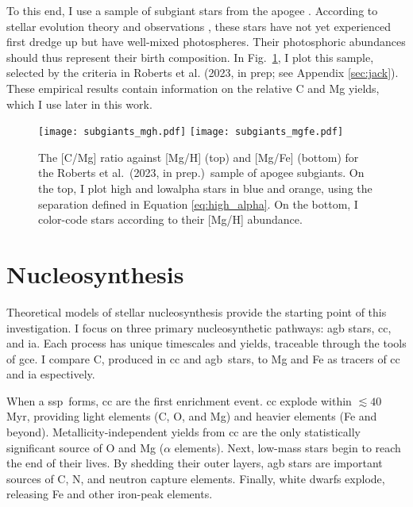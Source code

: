 \documentclass[12pt,oneside,letterpaper]{report}
\newcommand{\cc}{\gls{cc}}
\newcommand{\agb}{\gls{agb}}
\newcommand{\ia}{\gls{ia}}
\newcommand{\ssp}{\gls{ssp}}
\newcommand{\gce}{\gls{gce}}
\newcommand{\apogee}{\gls{apogee}}
\newcommand{\citetjack}{Roberts et al.~(2023, in prep.)}
\begin{document}
To this end, I use a sample of \gls{subgiant} stars from the \apogee{} \citep{apogee17}. According to stellar evolution theory and observations \citep{gilroy89, korn+07, lind+08, souto+18, souto19}, these stars have not yet experienced first dredge up but have well-mixed photospheres. Their photosphoric abundances should thus represent their birth composition.  In Fig.~\ref{fig:subgiants}, I plot this sample, selected by the criteria in Roberts et al. (2023, in prep; see Appendix \ref{sec:jack}). These empirical results contain information on the relative C and Mg yields, which I use later in this work.

\begin{figure}[htp]
    \centering
    \texttt{[image: subgiants\_mgh.pdf]}
    \quad\texttt{[image: subgiants\_mgfe.pdf]}
    \caption[APOGEE Subgiants]{The [C/Mg] ratio against [Mg/H] (top) and [Mg/Fe] (bottom) for the \citetjack~sample of \apogee{} \gls{subgiant}s. On the top, I plot high and \gls{lowalpha} stars in blue and orange, using the separation defined in Equation \ref{eq:high_alpha}. On the bottom, I color-code stars according to their [Mg/H] abundance.}
    \label{fig:subgiants}
\end{figure}








\chapter{Nucleosynthesis}

Theoretical models of stellar \gls{nucleosynthesis} provide the starting point of this investigation. I focus on three primary nucleosynthetic pathways: \agb{} stars, \cc{}, and \ia. Each process has unique timescales and \gls{yield}s, traceable through the tools of \gce. I compare C, produced in \cc{} and \agb\ stars, to Mg and Fe as tracers of \cc{} and \ia{} espectively.

When a \ssp~forms, \cc{} are the first enrichment event. \cc{}  explode within $\lesssim 40$ Myr, providing light elements (C, O, and Mg) and heavier elements (Fe and beyond). Metallicity-independent yields from \cc{} are the only statistically significant source of O and Mg ($\alpha$ elements). Next, low-mass stars begin to reach the end of their lives. By shedding their outer layers, \agb{} stars are important sources of C, N, and neutron capture elements.  Finally, white dwarfs explode, releasing Fe and other iron-peak elements.
\end{document}
